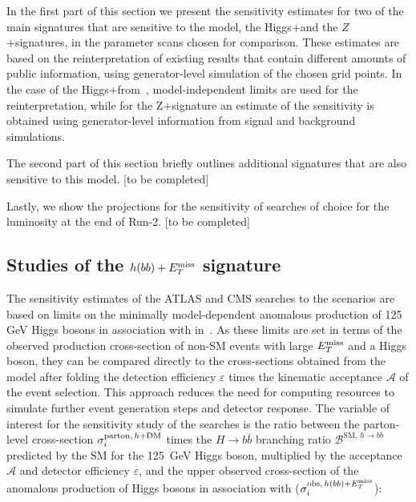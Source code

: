 In the first part of this section we present the sensitivity estimates for two of the main signatures that are sensitive to the model, the Higgs+\MET and the $Z$+\MET signatures, in the parameter scans chosen for comparison. These estimates are based on the reinterpretation of existing results that contain different amounts of public information, using generator-level simulation of the chosen grid points. In the case of the Higgs+\MET from~\cite{Aaboud:2017yqz}, model-independent limits are used for the reinterpretation, while for the Z+\MET signature an estimate of the sensitivity is obtained using generator-level information from signal and background simulations. 

The second part of this section briefly outlines additional signatures that are also sensitive to this model. [to be completed]

Lastly, we show the projections for the sensitivity of searches of choice for the luminosity at the end of Run-2. [to be completed]

\subsection{Studies of the $h(bb)+E_T^\mathrm{miss}$ signature}
\label{sec:sensi_monohbb}
%

The sensitivity estimates of the ATLAS and CMS \monohbb searches to the \hdma scenarios are based on limits on the minimally model-dependent anomalous production of 125 GeV Higgs bosons in association with \met in~\cite{Aaboud:2017yqz}. 
As these limits are set in terms of the observed production cross-section of non-SM events with large $E_T^\mathrm{miss}$ and a Higgs boson, they can be compared directly to the cross-sections obtained from the \hdma model after folding the detection efficiency $\varepsilon$ times the kinematic acceptance $\mathcal{A}$ of the event selection. This approach reduces the need for computing resources to simulate further event generation steps and detector response. 
The variable of interest for the sensitivity study of the \monohbb searches is the ratio between the parton-level cross-section $\sigma_{i}^{\mathrm{parton},\,h+\textrm{DM}}$ times the $H\rightarrow b\bar{b}$ branching ratio $\mathcal{B}^{\mathrm{SM},\,h\to bb}$ predicted by the SM for the 125~GeV Higgs boson, multiplied by the acceptance $\mathcal{A}$ and detector efficiency $\varepsilon$, and the upper observed cross-section of the anomalous production of Higgs bosons in association with \met ($\sigma_{i}^{\mathrm{obs},\,h(bb)+E_T^\mathrm{miss}}$):

